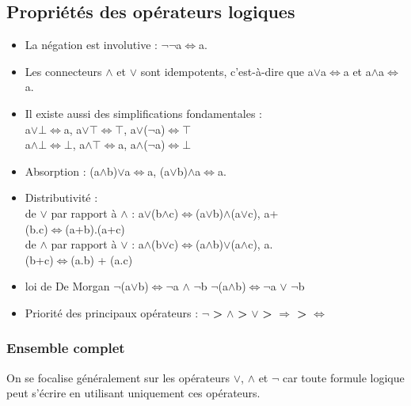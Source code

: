 \documentclass[a4paper,10pt]{book}
\begin{document}
\subsection{Propriétés des opérateurs logiques}
\begin{itemize}\renewcommand{\labelitemi}{$\bullet$} \item La négation est involutive : $\neg\neg$a$\Leftrightarrow$a.\\
\item Les connecteurs $\wedge$ et $\vee$ sont idempotents, c’est-à-dire que a$\vee$a$\Leftrightarrow$a et a$\wedge$a$\Leftrightarrow$a.\\
\item Il existe aussi des simplifications fondamentales :\\
a$\vee\bot\Leftrightarrow$a, a$\vee\top\Leftrightarrow\top$, a$\vee$($\neg$a)$\Leftrightarrow\top$\\
a$\wedge\bot\Leftrightarrow\bot$, a$\wedge\top\Leftrightarrow$a, a$\wedge$($\neg$a)$\Leftrightarrow\bot$\\
\item Absorption : (a$\wedge$b)$\vee$a$\Leftrightarrow$a, (a$\vee$b)$\wedge$a$\Leftrightarrow$a.\\
\item Distributivité : \\
de $\vee$ par rapport à $\wedge$ : a$\vee$(b$\wedge$c)$\Leftrightarrow$(a$\vee$b)$\wedge$(a$\vee$c), a+\\
(b.c)$\Leftrightarrow$(a+b).(a+c)\\
de $\wedge$ par rapport à $\vee$ : a$\wedge$(b$\vee$c)$\Leftrightarrow$(a$\wedge$b)$\vee$(a$\wedge$c), a.\\
(b+c)$\Leftrightarrow$(a.b) + (a.c)\\
\item loi de De Morgan
$\neg$(a$\vee$b)$\Leftrightarrow\neg$a $\wedge$ $\neg$b
$\neg$(a$\wedge$b)$\Leftrightarrow\neg$a $\vee$ $\neg$b\\

\item Priorité des principaux opérateurs : $\neg$ \textbf{>} $\wedge$ \textbf{>} $\vee$ \textbf{>} $\Rightarrow$ \textbf{>} $\Leftrightarrow$
\end{itemize}

\bigskip

\subsubsection{Ensemble complet}
On se focalise généralement sur les opérateurs $\vee$, $\wedge$ et $\neg$ car toute formule logique peut s’écrire en utilisant uniquement ces opérateurs.\\
\end{document}
